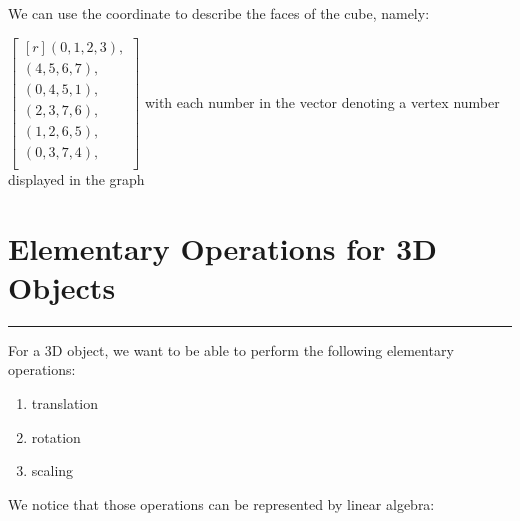 \documentclass[11pt]{article}
\newcommand{\mysection}[1]{
    \section*{#1}
    \hrule
    \vspace*{0.5cm}
}
\newcommand{\mat}[1]{
    $\begin{bmatrix*}[r]
        #1
    \end{bmatrix*}$
} %
\newcommand{\gap}{\vspace*{0.5cm}}
\begin{document}
We can use the coordinate to describe the faces of the cube, namely: 
\mat{
    (0, 1, 2, 3), \\
    (4, 5, 6, 7), \\
    (0, 4, 5, 1), \\
    (2, 3, 7, 6), \\
    (1, 2, 6, 5), \\
    (0, 3, 7, 4), \\
} with each number in the vector denoting a vertex number displayed in the graph \gap \\
\mysection{Elementary Operations for 3D Objects}
For a 3D object, we want to be able to perform the following elementary operations:
\begin{enumerate}
    \item translation
    \item rotation
    \item scaling
\end{enumerate}
We notice that those operations can be represented by linear algebra:
\end{document}
